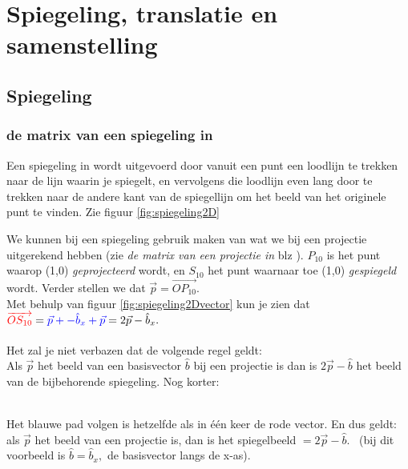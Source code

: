 \chapter{Spiegeling, translatie en samenstelling}
\label{chap: Spiegeling, translatie en samenstelling}
\section{Spiegeling}
\subsection{de matrix van een spiegeling in \RT}
Een spiegeling in \RT wordt uitgevoerd door vanuit een punt een loodlijn te trekken naar de lijn waarin je spiegelt, en vervolgens die loodlijn even lang door te trekken naar de andere kant van de spiegellijn om het beeld van het originele punt te vinden. Zie figuur \ref{fig:spiegeling2D}


  We kunnen bij een spiegeling gebruik maken van wat we bij een projectie uitgerekend hebben (zie 
\textit{de matrix van een projectie in \RT} blz \pageref{projectie2D}). $ P_{10}  $ is het punt waarop (1,0) \textit{geprojecteerd} wordt, en $ S_{10}  $ het punt  waarnaar toe (1,0) \textit{gespiegeld} wordt. Verder stellen we dat 
$\vec{p} = \overrightarrow{OP_{10} }. $\\ 
Met behulp van figuur \ref{fig:spiegeling2Dvector} kun je zien dat 
$  {\color{red} \overrightarrow{OS_{10} } }
=  {\color{blue} \vec{p}  + - \hat{b}_x+  \vec{p} }
= 2 \vec{p}  - \hat{b}_x. $ \\ \\
Het zal je  niet verbazen dat de volgende regel geldt:\\
Als $\vec{p} $ het beeld van een basisvector $ \hat{b}  $  bij een projectie is dan is $ 2 \vec{p}  - \hat{b} $ het beeld van de bijbehorende spiegeling. Nog korter: \\ \\

 { Het blauwe pad volgen is hetzelfde als  in één keer de rode vector.  
	En dus geldt: als $  \vec{p} $ het beeld van een projectie is, dan is het spiegelbeeld $ =  2\vec{p} - \hat{b}.  $ \  (bij dit voorbeeld  is $ \hat{b} = \hat{b}_x , $ de basisvector langs de x-as). }  

